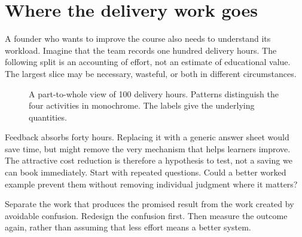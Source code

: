 \documentclass[11pt,twoside,openright]{book}
\begin{document}
\section{Where the delivery work goes}
A founder who wants to improve the course also needs to understand its workload.
Imagine that the team records one hundred delivery hours. The following split
is an accounting of effort, not an estimate of educational value. The largest
slice may be necessary, wasteful, or both in different circumstances.

\begin{figure}[H]
\centering
{}
\caption{A part-to-whole view of 100 delivery hours. Patterns distinguish the
four activities in monochrome. The labels give the underlying quantities.}
\end{figure}

Feedback absorbs forty hours. Replacing it with a generic answer sheet would
save time, but might remove the very mechanism that helps learners improve.
The attractive cost reduction is therefore a hypothesis to test, not a saving
we can book immediately. Start with repeated questions. Could a better worked
example prevent them without removing individual judgment where it matters?

\begin{TipBox}
Separate the work that produces the promised result from the work created by
avoidable confusion. Redesign the confusion first. Then measure the outcome
again, rather than assuming that less effort means a better system.
\end{TipBox}
\end{document}
